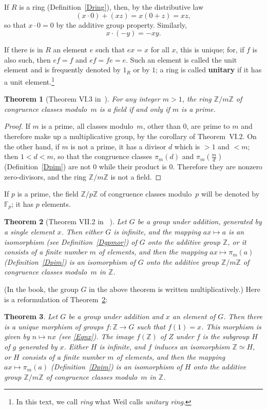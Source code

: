 \documentclass[12pt,letterpaper]{article}
\newcommand{\F}{\mathbb{F}}
\newcommand{\Z}{\mathbb{Z}}
\newcommand{\Zm}[1]{\Z/#1\Z}
\newtheorem{thm}{Theorem}%
\theoremstyle{definition}
\begin{document}
If $R$ is a ring (Definition~\ref{Dring}), then, by the distributive law 
$$
(x\cdot 0)+(xz)=x(0+z)=xz,
$$ 
so that $x\cdot 0=0$ by the additive group property. Similarly, 
$$
x\cdot(-y)=-xy.
$$ 

If there is in $R$ an element $e$ such that $ex=x$ for all $x$, this is unique; for, if $f$ is also such, then $ef=f$ and $ef = fe = e$. Such an element is called the unit element and is frequently denoted by $1_R$ or by $1$; a ring is called \textbf{unitary} if it has a unit element.\footnote{In this text, we call \emph{ring} what Weil calls \emph{unitary ring}.}

\begin{thm}[Theorem VI.3 in~\cite{weil1979}]\label{TVI3b}
For any integer $m>1$, the ring $\Zm{m}$ of congruence classes modulo~$m$ is a field if and only if $m$ is a prime. 
\end{thm}

\begin{proof} 
If $m$ is a prime, all classes modulo~$m$, other than $0$, are prime to $m$ and therefore make up a multiplicative group, by the corollary of Theorem~VI.2. On the other hand, if $m$ is not a prime, it has a divisor $d$ which is $>1$ and $<m$; then $1<d<m$, so that the congruence classes $\pi_m(d)$ and $\pi_m(\frac{m}{d})$ (Definition~\ref{Dpim}) are not $0$ while their product is $0$. Therefore they are nonzero zero-divisors, and the ring $\Zm{m}$ is not a field. 
\end{proof} 

If $p$ is a prime, the field $\Zm{p}$ of congruence classes modulo~$p$ will be denoted by $\F_p$; it has $p$ elements. 

\begin{thm}[Theorem VII.2 in ~\cite{weil1979}]\label{TVII2a}
Let $G$ be a group under addition, generated by a single element $x$. Then either $G$ is infinite, and the mapping $ax \mapsto a$ is an isomorphism (see Definition~\ref{Dgpmor}) of $G$ onto the additive group $\Z$, or it consists of a finite number $m$ of elements, and then the mapping $ax \mapsto \pi_m(a)$ (Definition~\ref{Dpim}) is an isomorphism of $G$ onto the additive group $\Zm{m}$ of congruence classes modulo~$m$ in $\Z$. 
\end{thm}

(In the book, the group $G$ in the above theorem is written multiplicatively.) Here is a reformulation of Theorem~\ref{TVII2a}: 

\begin{thm}\label{TVII2b}
Let $G$ be a group under addition and $x$ an element of $G$. Then there is a unique morphism of groups $f:\Z\to G$ such that $f(1)=x$. This morphism is given by $n\mapsto nx$ (see \eqref{Eqnx}). The image $f(\Z)$ of $Z$ under $f$ is the subgroup $H$ of $g$ generated by $x$. Either $H$ is infinite, and $f$ induces an isomorphism $\Z\simeq H$, or $H$ consists of a finite number $m$ of elements, and then the mapping $ax \mapsto \pi_m(a)$ (Definition~\ref{Dpim}) is an isomorphism of $H$ onto the additive group $\Zm{m}$ of congruence classes modulo~$m$ in $\Z$. 
\end{thm}
\end{document}
